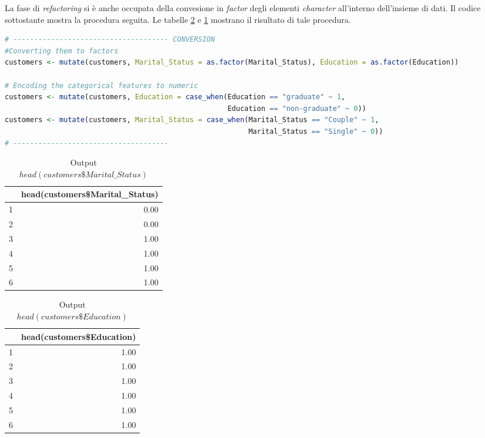 \documentclass[letterpaper,11pt]{article}
\begin{document}
La fase di \textit{refactoring} si è anche occupata della convesione in \textit{factor} degli elementi \textit{character} all'interno dell'insieme di dati.
Il codice sottostante mostra la procedura seguita. Le tabelle \ref{fig:head(customersEducation)} e \ref{fig:head(customersMaritalStatus)} mostrano il risultato di tale procedura.
\begin{lstlisting}[language=R]
# ------------------------------------- CONVERSION
#Converting them to factors
customers <- mutate(customers, Marital_Status = as.factor(Marital_Status), Education = as.factor(Education))

# Encoding the categorical features to numeric
customers <- mutate(customers, Education = case_when(Education == "graduate" ~ 1,
                                                     Education == "non-graduate" ~ 0))
customers <- mutate(customers, Marital_Status = case_when(Marital_Status == "Couple" ~ 1,
                                                          Marital_Status == "Single" ~ 0))
# ------------------------------------- 
\end{lstlisting}

\begin{table}[h!t]
\centering
\begin{tabular}{rr}
  \hline
 & head(customers\$Marital\_Status) \\ 
  \hline
1 & 0.00 \\ 
  2 & 0.00 \\ 
  3 & 1.00 \\ 
  4 & 1.00 \\ 
  5 & 1.00 \\ 
  6 & 1.00 \\ 
   \hline
\end{tabular}
\caption{Output $head(customers\$Marital\_Status)$}
\label{fig:head(customersMaritalStatus)}
\end{table}
\begin{table}[h!t]
\centering
\begin{tabular}{rr}
  \hline
 & head(customers\$Education) \\ 
  \hline
1 & 1.00 \\ 
  2 & 1.00 \\ 
  3 & 1.00 \\ 
  4 & 1.00 \\ 
  5 & 1.00 \\ 
  6 & 1.00 \\ 
   \hline
\end{tabular}
\caption{Output $head(customers\$Education)$}
\label{fig:head(customersEducation)}
\end{table}
\end{document}
